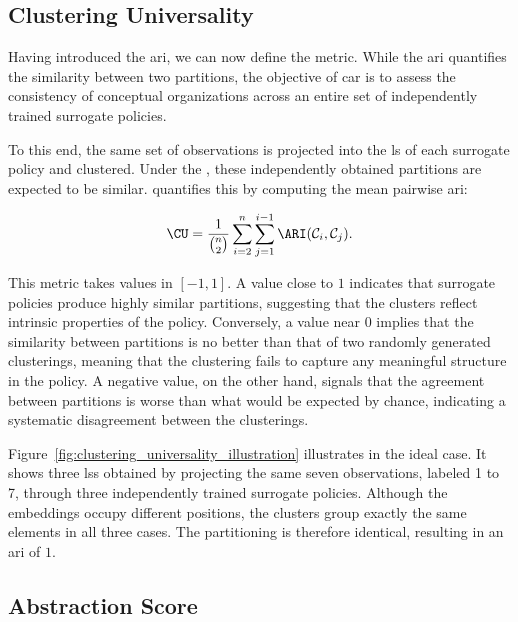 \subsection{Clustering Universality}
\label{subsec:clustering_universality}

Having introduced the \gls{ari}, we can now define the \ClusteringUniversalityName metric.
While the \gls{ari} quantifies the similarity between two partitions, the objective of \gls{car} is to assess the consistency of conceptual organizations across an entire set of independently trained surrogate policies.

To this end, the same set of observations is projected into the \gls{ls} of each surrogate policy and clustered.
Under the \RepresentationConvergenceHypothesisName, these independently obtained partitions are expected to be similar.
\ClusteringUniversalityName{} quantifies this by computing the mean pairwise \gls{ari}:

\begin{align}
    \CU
    =
    \frac{1}{\binom{n}{2}}
    \sum_{i=2}^{n}
    \sum_{j=1}^{i-1}
    \ARI(\mathcal{C}_{i}, \mathcal{C}_{j}).
\end{align}

This metric takes values in $[-1, 1]$.
A value close to $1$ indicates that surrogate policies produce highly similar partitions, suggesting that the clusters reflect intrinsic properties of the policy.
Conversely, a value near $0$ implies that the similarity between partitions is no better than that of two randomly generated clusterings, meaning that the clustering fails to capture any meaningful structure in the policy.
A negative value, on the other hand, signals that the agreement between partitions is worse than what would be expected by chance, indicating a systematic disagreement between the clusterings.

Figure~\ref{fig:clustering_universality_illustration} illustrates \ClusteringUniversalityName{} in the ideal case.
It shows three \glspl{ls} obtained by projecting the same seven observations, labeled 1 to 7, through three independently trained surrogate policies.
Although the embeddings occupy different positions, the clusters group exactly the same elements in all three cases.
The partitioning is therefore identical, resulting in an \gls{ari} of $1$.



\subsection{Abstraction Score}
\label{subsec:abstraction_score}

